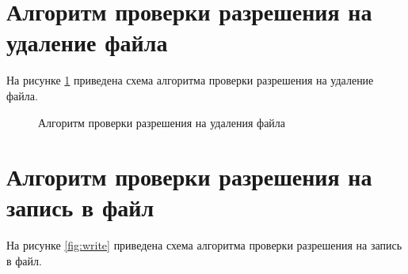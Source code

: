 \clearpage

\section{Алгоритм проверки разрешения на удаление файла}

На рисунке \ref{fig:unlink} приведена схема алгоритма проверки разрешения на удаление файла.

\begin{figure}[ph!]
	\caption{Алгоритм проверки разрешения на удаления файла}
	\label{fig:unlink}
\end{figure}

\clearpage

\section{Алгоритм проверки разрешения на запись в файл}

На рисунке \ref{fig:write} приведена схема алгоритма проверки разрешения на запись в файл.

